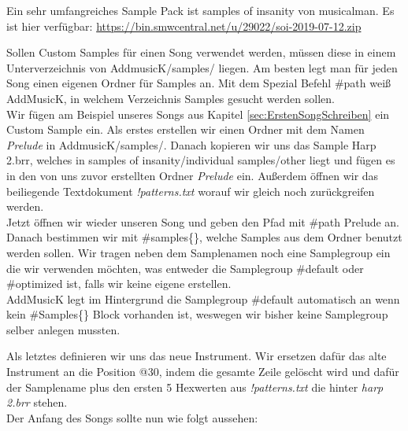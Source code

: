 \medskip

Ein sehr umfangreiches Sample Pack ist samples of insanity von musicalman. Es ist hier verfügbar:
\href{https://bin.smwcentral.net/u/29022/soi-2019-07-12.zip}{https://bin.smwcentral.net/u/29022/soi-2019-07-12.zip}

\bigskip

Sollen Custom Samples für einen Song verwendet werden, müssen diese in einem Unterverzeichnis von AddmusicK/samples/ liegen. Am besten legt man für jeden Song einen eigenen Ordner für Samples an. Mit dem Spezial Befehl \#path weiß AddMusicK, in welchem Verzeichnis Samples gesucht werden sollen. \\
Wir fügen am Beispiel unseres Songs aus Kapitel \ref{sec:ErstenSongSchreiben} ein Custom Sample ein. Als erstes erstellen wir einen Ordner mit dem Namen \textit{Prelude} in AddmusicK/samples/. Danach kopieren wir uns das Sample Harp 2.brr, welches in samples of insanity/individual samples/other liegt und fügen es in den von uns zuvor erstellten Ordner \textit{Prelude} ein. Außerdem öffnen wir das beiliegende Textdokument \textit{!patterns.txt} worauf wir gleich noch zurückgreifen werden. \\
Jetzt öffnen wir wieder unseren Song und geben den Pfad mit \#path  \dq Prelude\dq{} an. Danach bestimmen wir mit \#samples\{\}, welche Samples aus dem Ordner benutzt werden sollen. Wir tragen neben dem Samplenamen noch eine Samplegroup ein die wir verwenden möchten, was entweder die Samplegroup \#default oder \#optimized ist, falls wir keine eigene erstellen. \\
AddMusicK legt im Hintergrund die Samplegroup \#default automatisch an wenn kein \#Samples\{\} Block vorhanden ist, weswegen wir bisher keine Samplegroup selber anlegen mussten.


\medskip



\medskip

Als letztes definieren wir uns das neue Instrument. Wir ersetzen dafür das alte Instrument an die Position @30, indem  die gesamte Zeile gelöscht wird und dafür der Samplename plus den ersten 5 Hexwerten aus  \textit{!patterns.txt} die hinter  \textit{harp 2.brr} stehen. \\
Der Anfang des Songs sollte nun wie folgt aussehen:

\medskip



